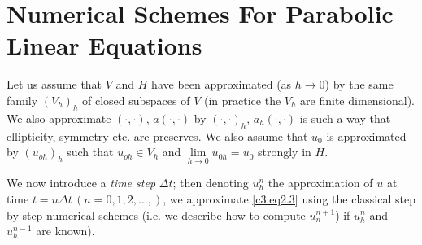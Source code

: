  \section{Numerical Schemes For Parabolic Linear Equations}\label{c3:s3}

 Let us assume that $V$ and $H$ have been approximated (as $h \to 0$)
 by the same family $(V_h)_h$ of closed subspaces of $V$ (in practice
 the $V_h$ are finite dimensional). We also approximate $(\cdot ,
 \cdot)$,  $a(\cdot , \cdot)$ by $(\cdot,\cdot)_h$, $a_h (\cdot ,
 \cdot)$ is such a way that ellipticity, symmetry etc. are
 preserves. We also assume that $u_0$ is approximated  by $(u_{oh})_h$
 such that $u_{oh} \in V_h$ and $\lim\limits_{h \to 0} u_{0h} = u_0$
 strongly in $H$.
 
We now introduce a \textit{ time step } $\Delta  t$; then denoting
$u^n_h$ the approximation of $u$ at time $t = n \Delta t \,(n = 0, 1, 2,
\ldots,)$, we approximate \eqref{c3:eq2.3} using the classical step by
step numerical schemes (i.e. we describe how to compute $u_n^{n+1}$)
if $u_h^n$ and $u^{n-1}_h$ are known). 

